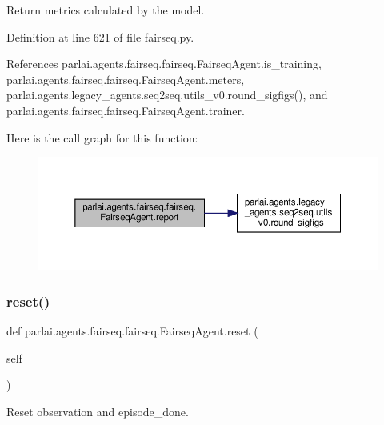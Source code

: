 \begin{DoxyVerb}Return metrics calculated by the model.\end{DoxyVerb}
 

Definition at line 621 of file fairseq.\+py.



References parlai.\+agents.\+fairseq.\+fairseq.\+Fairseq\+Agent.\+is\+\_\+training, parlai.\+agents.\+fairseq.\+fairseq.\+Fairseq\+Agent.\+meters, parlai.\+agents.\+legacy\+\_\+agents.\+seq2seq.\+utils\+\_\+v0.\+round\+\_\+sigfigs(), and parlai.\+agents.\+fairseq.\+fairseq.\+Fairseq\+Agent.\+trainer.

Here is the call graph for this function\+:
\nopagebreak
\begin{figure}[H]
\begin{center}
\leavevmode
\includegraphics[width=350pt]{classparlai_1_1agents_1_1fairseq_1_1fairseq_1_1FairseqAgent_af7629e9695ec1f9e0f7368095a41b69c_cgraph}
\end{center}
\end{figure}
\mbox{\label{classparlai_1_1agents_1_1fairseq_1_1fairseq_1_1FairseqAgent_acc5aa3887a6bf3ece28d60a9572fe50e}} 
\subsubsection{\texorpdfstring{reset()}{reset()}}
{\footnotesize\ttfamily def parlai.\+agents.\+fairseq.\+fairseq.\+Fairseq\+Agent.\+reset (\begin{DoxyParamCaption}\item[{}]{self }\end{DoxyParamCaption})}

\begin{DoxyVerb}Reset observation and episode_done.\end{DoxyVerb}
 

